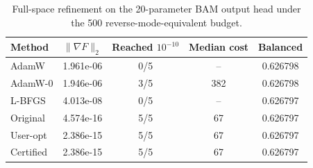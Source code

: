 \begin{table}[t]
\centering
\caption{Full-space refinement on the 20-parameter BAM output head under the 500 reverse-mode-equivalent budget.}
\label{tab:bam-head-precision}
\begin{tabular}{lcccc}
\toprule
Method & $\|\nabla F\|_2$ & Reached $10^{-10}$ & Median cost & Balanced \\
\midrule
AdamW & 1.961e-06 & 0/5 & -- & 0.626798 \\
AdamW-0 & 1.946e-06 & 3/5 & 382 & 0.626798 \\
L-BFGS & 4.013e-08 & 0/5 & -- & 0.626797 \\
Original & 4.574e-16 & 5/5 & 67 & 0.626797 \\
User-opt & 2.386e-15 & 5/5 & 67 & 0.626797 \\
Certified & 2.386e-15 & 5/5 & 67 & 0.626797 \\
\bottomrule
\end{tabular}
\end{table}
